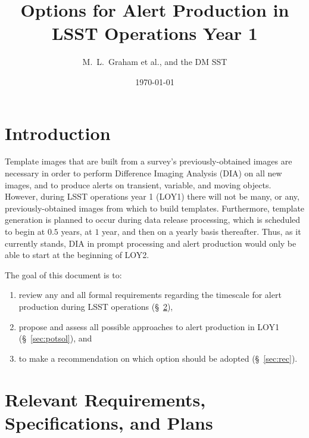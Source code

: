 \documentclass[DM,lsstdraft,toc]{lsstdoc}
\title[Alert Production in Year 1]{Options for Alert Production in \\ LSST Operations Year 1}
\author{M.~L.~Graham et al., and the DM SST}
\date{\today}
\begin{document}
\maketitle


\section{Introduction} \label{sec:intro}

Template images that are built from a survey's previously-obtained images are necessary in order to perform Difference Imaging Analysis (DIA) on all new images, and to produce alerts on transient, variable, and moving objects. However, during LSST operations year 1 (LOY1) there will not be many, or any, previously-obtained images from which to build templates. Furthermore, template generation is planned to occur during data release processing, which is scheduled to begin at $0.5$ years, at $1$ year, and then on a yearly basis thereafter. Thus, as it currently stands, DIA in prompt processing and alert production would only be able to start at the beginning of LOY2. 

The goal of this document is to:
\begin{enumerate}
\item review any and all formal requirements regarding the timescale for alert production during LSST operations (\S~\ref{sec:req}), 
\item propose and assess all possible approaches to alert production in LOY1 (\S~\ref{sec:potsol}), and 
\item to make a recommendation on which option should be adopted (\S~\ref{sec:rec}).
\end{enumerate}


\section{Relevant Requirements, Specifications, and Plans}\label{sec:req}
\end{document}
